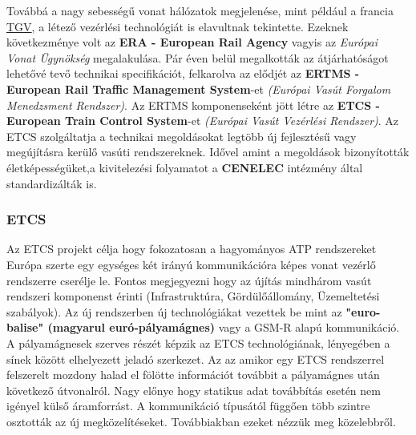 \documentclass[a4paper,12pt]{article}
\begin{document}
Továbbá a nagy sebességű vonat hálózatok megjelenése, mint például a francia \underline{TGV}, a létező vezérlési technológiát is elavultnak tekintette.
Ezeknek következménye volt az \textbf{ERA - European Rail Agency} vagyis az \textit{Európai Vonat Ügynökség} megalakulása. 
Pár éven belül megalkották az átjárhatóságot lehetővé tevő technikai specifikációt, felkarolva az elődjét az \textbf{ERTMS - European Rail Traffic Management System}-et \textit{(Európai Vasút Forgalom Menedzsment Rendszer)}.
Az ERTMS komponenseként jött létre az \textbf{ETCS - European Train Control System}-et \textit{(Európai Vasút Vezérlési Rendszer)}.
Az ETCS szolgáltatja a technikai megoldásokat legtöbb új fejlesztésű vagy megújításra kerülő vasúti rendszereknek.
Idővel amint a megoldások bizonyították életképességüket,a kivitelezési folyamatot a \textbf{CENELEC} intézmény által standardizálták is.
\subsubsection{ETCS}
Az ETCS projekt célja hogy fokozatosan a hagyományos ATP rendszereket Európa szerte egy egységes két irányú kommunikációra képes vonat vezérlő rendszerre cserélje le.
Fontos megjegyezni hogy az újítás mindhárom vasút rendszeri komponenst érinti (Infrastruktúra, Gördülőállomány, Üzemeltetési szabályok).
Az új rendszerben új technológiákat vezettek be mint az \textbf{"euro-balise" (magyarul euró-pályamágnes)} vagy a GSM-R alapú kommunikáció. 
A pályamágnesek szerves részét képzik az ETCS technológiának, lényegében a sínek között elhelyezett jeladó szerkezet. 
Az az amikor egy ETCS rendszerrel felszerelt mozdony halad el fölötte információt továbbit a pályamágnes után következő útvonalról. Nagy előnye hogy statikus adat továbbítás esetén nem igényel külső áramforrást.
A kommunikáció típusától függően több szintre osztották az új megközelítéseket. 
Továbbiakban ezeket nézzük meg közelebbről.
\end{document}
